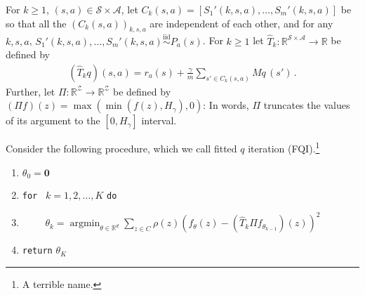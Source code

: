\documentclass{article}
\newcommand{\R}{\mathbb{R}}
\newcommand{\cZ}{\mathcal{Z}}
\DeclareMathOperator*{\argmin}{argmin}
\DeclareMathOperator*{\1}{\mathbbm{1}}
\newcommand{\0}{\mathbf{0}}
\theoremstyle{definition}
\theoremstyle{remark}
\theoremstyle{theorem}
\newcommand{\cS}{\mathcal{S}}
\newcommand{\cA}{\mathcal{A}}
\begin{document}
For $k\ge 1$, $(s,a)\in \cS \times \cA$, let $C_k(s,a) = [S_1'(k,s,a),\dots,S_m'(k,s,a)]$ be so that all the $(C_k(s,a))_{k,s,a}$ are independent of each other, and for any $k,s,a$, $S_1'(k,s,a),\dots,S_m'(k,s,a) \stackrel{\textrm{iid}}{\sim} P_a(s)$.
For $k\ge 1$ let $\hat T_k: \R^{\cS\times \cA} \to \R$ be defined by
\begin{align*}
(\hat T_k q)(s,a) = r_a(s) + \frac{\gamma}{m} \sum_{s'\in C_k(s,a)} Mq \, (s')\,.
\end{align*}
Further, let $\Pi: \R^{\cZ} \to \R^{\cZ}$ be defined by $(\Pi f)(z) = \max(\min(f(z),H_\gamma),0)$: In words, $\Pi$ truncates the values of its argument to the $[0,H_\gamma]$ interval.

Consider the following procedure, which we call fitted $q$ iteration (FQI).\footnote{A terrible name.}
\begin{enumerate}
\item $\theta_0 = \0$
\item {\tt for } $k=1,2,\dots,K$ {\tt do}
\item $\qquad$ $\theta_k = \argmin_{\theta\in \R^d} \sum_{z\in C} \rho(z) (f_\theta(z)-(\hat T_k \Pi f_{\theta_{k-1}})(z))^2$
\item {\tt return} $\theta_K$
\end{enumerate}
\end{document}
